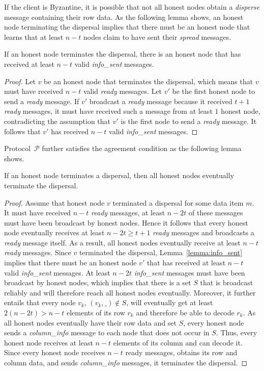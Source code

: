 \documentclass[sigconf,screen]{acmart}
\begin{document}
If the client is Byzantine, it is possible that not all honest nodes obtain a \emph{disperse} message containing their row data. As the following lemma shows, an honest node terminating the dispersal implies that there must be an honest node that learns that at least $n-t$
nodes claim to have sent their \emph{spread} messages.

\begin{lemma}\label{lemma:info_sent} If an honest node terminates the dispersal, there is an honest node that has received at least $n-t$ valid \emph{info\_sent} messages.
\end{lemma}
\begin{proof}
Let $v$ be an honest node that terminates the dispersal, which means that $v$ must have received $n-t$ valid \emph{ready} messages. Let $v'$ be the first honest node to send a \emph{ready} message. If $v'$ broadcast a \emph{ready} message because it received $t+1$ \emph{ready} messages, it must have received such a message from at least $1$ honest node, contradicting the assumption that $v'$ is the first node to send a \emph{ready} message. It follows that $v'$ has received $n-t$ valid \emph{info\_sent} messages.
\end{proof}

Protocol~$\mathcal{P}$ further satisfies the agreement condition as the following lemma shows.

\begin{lemma}[Agreement]\label{lemma:avid_agreement} If an honest node terminates a dispersal, then all honest nodes eventually terminate the dispersal.
\end{lemma}
\begin{proof}
Assume that honest node $v$ terminated a dispersal for some data item $m$.
It must have received $n-t$ \emph{ready} messages, at least $n-2t$ of these messages must have been broadcast by honest nodes. Hence it follows that every honest node eventually receives at least $n-2t \ge t+1$ \emph{ready} messages and broadcasts a \emph{ready} message itself. As a result, all honest nodes eventually receive at least $n-t$ \emph{ready} messages.
%
Since $v$ terminated the dispersal, Lemma~\ref{lemma:info_sent} implies that there must be an honest node $v'$ that has received at least $n-t$ valid \emph{info\_sent} messages. At least $n-2t$ \emph{info\_sent} messages must have been broadcast by honest nodes, which implies that there is a set $S$ that is broadcast reliably and will therefore reach all honest nodes eventually. Moreover, it further entails that every node $v_k$, $(v_k, \_) \notin S$, will eventually get at least $2(n-2t)>n-t$ elements of its row $r_k$ and therefore be able to decode $r_k$. As all honest nodes eventually have their row data and set $S$, every honest node sends a \emph{column\_info} message to each node that does not occur in $S$. Thus, every honest node receives at least $n-t$ elements of its column and can decode it. Since every honest node receives $n-t$ ready messages, obtains its row and column data, and sends \emph{column\_info} messages, it terminates the dispersal.
\end{proof}
\end{document}
